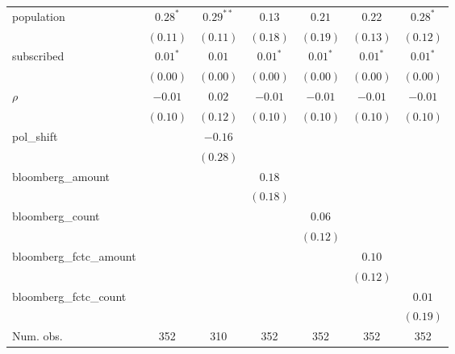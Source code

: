 \begin{table}[!h]
\begin{center}
\begin{tabular}{l c c c c c c }
population              & $0.28^{*}$   & $0.29^{**}$  & $0.13$       & $0.21$       & $0.22$       & $0.28^{*}$   \\
                        & $(0.11)$     & $(0.11)$     & $(0.18)$     & $(0.19)$     & $(0.13)$     & $(0.12)$     \\
subscribed              & $0.01^{*}$   & $0.01$       & $0.01^{*}$   & $0.01^{*}$   & $0.01^{*}$   & $0.01^{*}$   \\
                        & $(0.00)$     & $(0.00)$     & $(0.00)$     & $(0.00)$     & $(0.00)$     & $(0.00)$     \\
$\rho$                  & $-0.01$      & $0.02$       & $-0.01$      & $-0.01$      & $-0.01$      & $-0.01$      \\
                        & $(0.10)$     & $(0.12)$     & $(0.10)$     & $(0.10)$     & $(0.10)$     & $(0.10)$     \\
pol\_shift              &              & $-0.16$      &              &              &              &              \\
                        &              & $(0.28)$     &              &              &              &              \\
bloomberg\_amount       &              &              & $0.18$       &              &              &              \\
                        &              &              & $(0.18)$     &              &              &              \\
bloomberg\_count        &              &              &              & $0.06$       &              &              \\
                        &              &              &              & $(0.12)$     &              &              \\
bloomberg\_fctc\_amount &              &              &              &              & $0.10$       &              \\
                        &              &              &              &              & $(0.12)$     &              \\
bloomberg\_fctc\_count  &              &              &              &              &              & $0.01$       \\
                        &              &              &              &              &              & $(0.19)$     \\
\midrule
Num. obs.               & 352          & 310          & 352          & 352          & 352          & 352          \\

\end{tabular}
\end{center}
\end{table}
